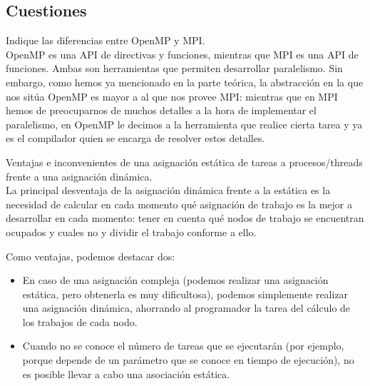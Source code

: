 \subsection{Cuestiones}
\begin{cuestion}
    Indique las diferencias entre OpenMP y MPI.\\

    OpenMP es una API de directivas y funciones, mientras que MPI es una API de funciones. Ambas son herramientas que permiten desarrollar paralelismo. Sin embargo, como hemos ya mencionado en la parte teórica, la abstracción en la que nos sitúa OpenMP es mayor a al que nos provee MPI: mientras que en MPI hemos de preocuparnos de muchos detalles a la hora de implementar el paralelismo, en OpenMP le decimos a la herramienta que realice cierta tarea y ya es el compilador quien se encarga de resolver estos detalles.
\end{cuestion}

\begin{cuestion}
    Ventajas e inconvenientes de una asignación estática de tareas a procesos/threads frente a una asignación dinámica.\\

    La principal desventaja de la asignación dinámica frente a la estática es la necesidad de calcular en cada momento qué asignación de trabajo es la mejor a desarrollar en cada momento: tener en cuenta qué nodos de trabajo se encuentran ocupados y cuales no y dividir el trabajo conforme a ello.

    Como ventajas, podemos destacar dos:
    \begin{itemize}
        \item En caso de una asignación compleja (podemos realizar una asignación estática, pero obtenerla es muy dificultosa), podemos simplemente realizar una asignación dinámica, ahorrando al programador la tarea del cálculo de los trabajos de cada nodo.
        \item Cuando no se conoce el número de tareas que se ejecutarán (por ejemplo, porque depende de un parámetro que se conoce en tiempo de ejecución), no es posible llevar a cabo una asociación estática.
    \end{itemize}
\end{cuestion}

